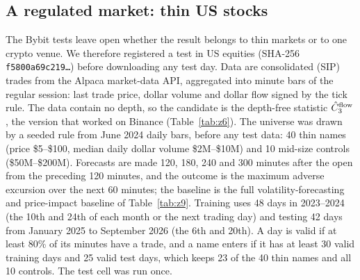 \subsection{A regulated market: thin US stocks}\label{sec:us}
The Bybit tests leave open whether the result belongs to thin markets or to one crypto venue. We therefore registered a test in US equities (SHA-256 \texttt{f5800a69c219\ldots}) before downloading any test day. Data are consolidated (SIP) trades from the Alpaca market-data API, aggregated into minute bars of the regular session: last trade price, dollar volume and dollar flow signed by the tick rule. The data contain no depth, so the candidate is the depth-free statistic $\hat C_3^{\rm flow}$, the version that worked on Binance (Table~\ref{tab:z6}). The universe was drawn by a seeded rule from June 2024 daily bars, before any test data: 40 thin names (price \$5--\$100, median daily dollar volume \$2M--\$10M) and 10 mid-size controls (\$50M--\$200M). Forecasts are made 120, 180, 240 and 300 minutes after the open from the preceding 120 minutes, and the outcome is the maximum adverse excursion over the next 60 minutes; the baseline is the full volatility-forecasting and price-impact baseline of Table~\ref{tab:z9}. Training uses 48 days in 2023--2024 (the 10th and 24th of each month or the next trading day) and testing 42 days from January 2025 to September 2026 (the 6th and 20th). A day is valid if at least 80\% of its minutes have a trade, and a name enters if it has at least 30 valid training days and 25 valid test days, which keeps 23 of the 40 thin names and all 10 controls. The test cell was run once.


